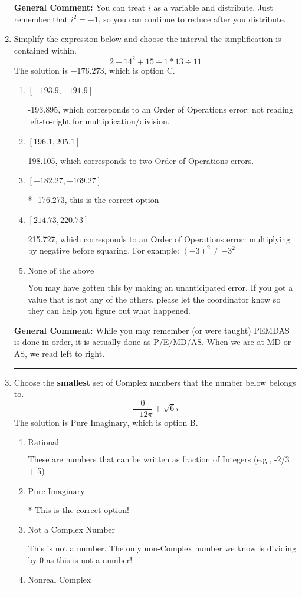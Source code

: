 \documentclass{extbook}[14pt]
\newcommand{\litem}[1]{\item #1

\rule{\textwidth}{0.4pt}}
\begin{document}
\begin{enumerate}
{\textbf{General Comment:} You can treat $i$ as a variable and distribute. Just remember that $i^2=-1$, so you can continue to reduce after you distribute.
}
\litem{
Simplify the expression below and choose the interval the simplification is contained within.
\[ 2 - 14^2 + 15 \div 1 * 13 \div 11 \]The solution is \( -176.273 \), which is option C.\begin{enumerate}[label=\Alph*.]
\item \( [-193.9, -191.9] \)

 -193.895, which corresponds to an Order of Operations error: not reading left-to-right for multiplication/division.
\item \( [196.1, 205.1] \)

 198.105, which corresponds to two Order of Operations errors.
\item \( [-182.27, -169.27] \)

* -176.273, this is the correct option
\item \( [214.73, 220.73] \)

 215.727, which corresponds to an Order of Operations error: multiplying by negative before squaring. For example: $(-3)^2 \neq -3^2$
\item \( \text{None of the above} \)

 You may have gotten this by making an unanticipated error. If you got a value that is not any of the others, please let the coordinator know so they can help you figure out what happened.
\end{enumerate}

\textbf{General Comment:} While you may remember (or were taught) PEMDAS is done in order, it is actually done as P/E/MD/AS. When we are at MD or AS, we read left to right.
}
\litem{
Choose the \textbf{smallest} set of Complex numbers that the number below belongs to.
\[ \frac{0}{-12 \pi}+\sqrt{6}i \]The solution is \( \text{Pure Imaginary} \), which is option B.\begin{enumerate}[label=\Alph*.]
\item \( \text{Rational} \)

These are numbers that can be written as fraction of Integers (e.g., -2/3 + 5)
\item \( \text{Pure Imaginary} \)

* This is the correct option!
\item \( \text{Not a Complex Number} \)

This is not a number. The only non-Complex number we know is dividing by 0 as this is not a number!
\item \( \text{Nonreal Complex} \)


\end{enumerate}}
\end{enumerate}
\end{document}
